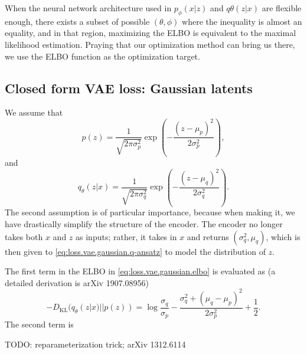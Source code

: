 \documentclass[hyperref, a4paper, 12pt]{report}
\begin{document}
When the neural network architecture used in $p_\phi(x|z)$ and $q\theta(z|x)$ are flexible enough,
there exists a subset of possible $(\theta, \phi)$ where the inequality is almost an equality,
and in that region, maximizing the ELBO is equivalent to the maximal likelihood estimation.
Praying that our optimization method can bring us there,
we use the ELBO function as the optimization target.

\subsection{Closed form VAE loss: Gaussian latents}

We assume that 
\begin{equation}
    p(z) = \frac{1}{\sqrt{2\pi \sigma_p^2}} \exp(- \frac{(z - \mu_p)^2}{2 \sigma_p^2}),
\end{equation} 
and 
\begin{equation}
    q_\theta(z | x) = \frac{1}{\sqrt{2\pi \sigma_q^2}} \exp(- \frac{(z - \mu_q)^2}{2 \sigma_q^2}).
    \label{eq:loss.vae.gaussian.q-ansatz}
\end{equation}
The second assumption is of particular importance,
because when making it, we have drastically simplify the structure of the encoder.
The encoder no longer takes both $x$ and $z$ as inputs;
rather, it takes in $x$ and returns $(\sigma_q^2, \mu_q)$,
which is then given to \eqref{eq:loss.vae.gaussian.q-ansatz} to model the distribution of $z$.

The first term in the ELBO in \eqref{eq:loss.vae.gaussian.elbo} is evaluated as (a detailed derivation is arXiv 1907.08956)
\begin{equation}
    - D_{\text{KL}}(q_\theta(z|x) || p(z)) = \log \frac{\sigma_q}{\sigma_p} - \frac{\sigma_q^2 + (\mu_q - \mu_p)^2}{2 \sigma_p^2} + \frac{1}{2}.
\end{equation}
The second term is 

TODO: reparameterization trick; arXiv 1312.6114

\printbibliography[title=References]
\end{document}
